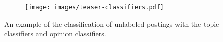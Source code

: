 
\begin{figure}[!tbp]
	\centering
    \begin{subfigure}{0.48\textwidth}
		\texttt{[image: images/teaser-classifiers.pdf]}
	\end{subfigure}
	\caption{
        An example of the classification of unlabeled postings with the topic classifiers and opinion classifiers.
	}
	\label{fig:teaser-classifiers}
\end{figure}
